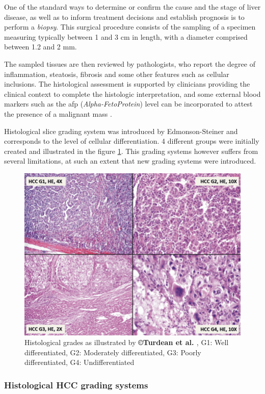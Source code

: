One of the standard ways to determine or confirm the cause and the stage
of liver disease, as well as to inform treatment decisions and establish
prognosis is to perform a \emph{biopsy}. This surgical procedure consists of the sampling of a specimen measuring typically between 1 and 3 cm in length, with a diameter comprised between 1.2 and 2 mm\cite{Bravo2001}.

The sampled tissues are then reviewed by pathologists, who report the
degree of inflammation, steatosis, fibrosis and some other features such
as cellular inclusions. The histological assessment is supported by
clinicians providing the clinical context to complete the histologic
interpretation, and some external blood markers such as the \ac{afp}
(\emph{Alpha-FetoProtein}) level can be incorporated to attest the presence of
a malignant mass \cite{Bai2017a, Heimbach2018}.

Histological slice grading system was introduced by Edmonson-Steiner and corresponds to the level of cellular differentiation. 4 different groups were initially created and illustrated in the figure \ref{HistologicalGrades}. 
This grading systems however suffers from several limitations, at such an extent that new grading systems were introduced.

\begin{figure}[th!]
\centering
\includegraphics[width=0.7\linewidth]{images/image7}
\caption{Histological grades as illustrated by \textbf{©Turdean et al. \cite{Turdean2012}}, G1: Well differentiated, G2: Moderately differentiated, G3: Poorly differentiated, G4: Undifferentiated}
\label{HistologicalGrades}
\end{figure}


\subsubsection{Histological HCC grading systems}\label{histological-hcc-grading-systems}

